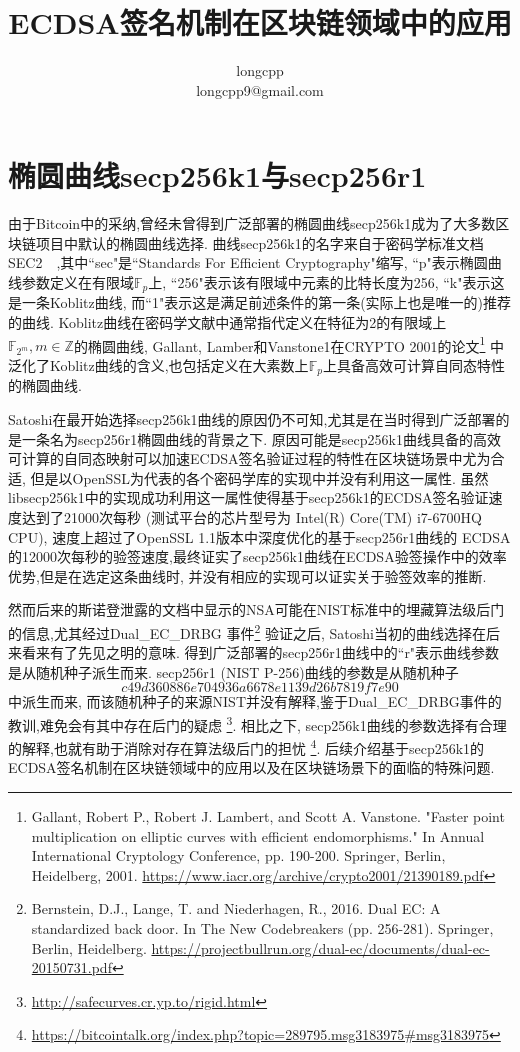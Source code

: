 \documentclass{article}
\newcommand{\Z}{\mathbb{Z}}
\newcommand{\F}{\mathbb{F}}
\begin{document}
\title{ECDSA签名机制在区块链领域中的应用}
\author{longcpp \\ longcpp9@gmail.com}

\maketitle

\section{椭圆曲线secp256k1与secp256r1}

由于Bitcoin中的采纳,曾经未曾得到广泛部署的椭圆曲线secp256k1成为了大多数区块链项目中默认的椭圆曲线选择.
曲线secp256k1的名字来自于密码学标准文档SEC2~\cite{}~,其中``sec"是``Standards For Efficient Cryptography"缩写,
``p"表示椭圆曲线参数定义在有限域$\F_p$上, ``256"表示该有限域中元素的比特长度为256, 
``k"表示这是一条Koblitz曲线, 而``1"表示这是满足前述条件的第一条(实际上也是唯一的)推荐的曲线.
Koblitz曲线在密码学文献中通常指代定义在特征为2的有限域上$\F_{2^m}, m\in\Z$的椭圆曲线,
Gallant, Lamber和Vanstone1在CRYPTO 2001的论文\footnote{
Gallant, Robert P., Robert J. Lambert, and Scott A. Vanstone. "Faster point multiplication on elliptic curves with efficient endomorphisms." In Annual International Cryptology Conference, pp. 190-200. Springer, Berlin, Heidelberg, 2001.
\url{https://www.iacr.org/archive/crypto2001/21390189.pdf}}
中泛化了Koblitz曲线的含义,也包括定义在大素数上$\F_p$上具备高效可计算自同态特性的椭圆曲线.

Satoshi在最开始选择secp256k1曲线的原因仍不可知,尤其是在当时得到广泛部署的是一条名为secp256r1椭圆曲线的背景之下.
原因可能是secp256k1曲线具备的高效可计算的自同态映射可以加速ECDSA签名验证过程的特性在区块链场景中尤为合适,
但是以OpenSSL为代表的各个密码学库的实现中并没有利用这一属性.
虽然libsecp256k1中的实现成功利用这一属性使得基于secp256k1的ECDSA签名验证速度达到了21000次每秒
(测试平台的芯片型号为 Intel(R) Core(TM) i7-6700HQ CPU), 速度上超过了OpenSSL 1.1版本中深度优化的基于secp256r1曲线的
ECDSA的12000次每秒的验签速度,最终证实了secp256k1曲线在ECDSA验签操作中的效率优势,但是在选定这条曲线时,
并没有相应的实现可以证实关于验签效率的推断.

然而后来的斯诺登泄露的文档中显示的NSA可能在NIST标准中的埋藏算法级后门的信息,尤其经过Dual_EC_DRBG
事件\footnote{
Bernstein, D.J., Lange, T. and Niederhagen, R., 2016. Dual EC: A standardized back door. In The New Codebreakers (pp. 256-281). Springer, Berlin, Heidelberg.
\url{https://projectbullrun.org/dual-ec/documents/dual-ec-20150731.pdf}}
验证之后, Satoshi当初的曲线选择在后来看来有了先见之明的意味. 
得到广泛部署的secp256r1曲线中的``r"表示曲线参数是从随机种子派生而来. 
secp256r1 (NIST P-256)曲线的参数是从随机种子
$$c49d3608 86e70493 6a6678e1 139d26b7 819f7e90$$
中派生而来, 而该随机种子的来源NIST并没有解释,鉴于Dual_EC_DRBG事件的教训,难免会有其中存在后门的疑虑
\footnote{\url{http://safecurves.cr.yp.to/rigid.html}}.
相比之下, secp256k1曲线的参数选择有合理的解释,也就有助于消除对存在算法级后门的担忧
\footnote{\url{https://bitcointalk.org/index.php?topic=289795.msg3183975\#msg3183975}}.
后续介绍基于secp256k1的ECDSA签名机制在区块链领域中的应用以及在区块链场景下的面临的特殊问题.
\end{document}
